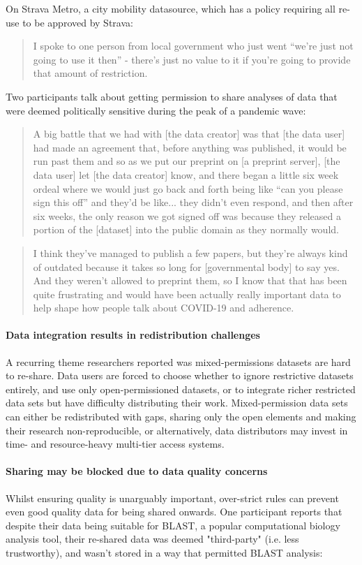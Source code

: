 \documentclass{CUP-JNL-DAP}%
\begin{document}
On Strava Metro, a city mobility datasource, which has a policy requiring all re-use to be approved by Strava:

\blockquote {I spoke to one person from local government who just went \enquote{we're just not going to use it then} - there's just no value to it if you're going to provide that amount of restriction.}

Two participants talk about getting permission to share analyses of data that were deemed politically sensitive during the peak of a pandemic wave: 

\blockquote{A big battle that we had with [the data creator] was that [the data user] had made an agreement that, before anything was published, it would be run past them and so as we put our  preprint on [a preprint server], [the data user] let [the data creator] know, and there began a little six week ordeal where we would just go back and forth being like \enquote{can you please sign this off} and they'd be like... they didn't even respond, and then after six weeks, the only reason we got signed off was because they released a portion of the [dataset] into the public domain as they normally would.}

\blockquote{I think they've managed to publish a few papers, but they're always kind of outdated because it takes so long for [governmental body] to say yes. And they weren't allowed to preprint them, so I know that that has been quite frustrating and would have been actually really important data to help shape how people talk about COVID-19 and adherence.}

\paragraph{Data integration results in redistribution challenges}
A recurring theme researchers reported was mixed-permissions datasets are hard to re-share. Data users are forced to choose whether to ignore restrictive datasets entirely, and use only open-permissioned datasets, or to integrate richer restricted data sets but have difficulty distributing their work. Mixed-permission data sets can either be redistributed with gaps, sharing only the open elements and making their research non-reproducible, or alternatively, data distributors may invest in time- and resource-heavy multi-tier access systems. 

\paragraph{Sharing may be blocked due to data quality concerns}
Whilst ensuring quality is unarguably important, over-strict rules can prevent even good quality data for being shared onwards.  One participant reports that despite their data being suitable for BLAST, a popular computational biology analysis tool, their re-shared data was deemed "third-party" (i.e. less trustworthy), and wasn't stored in a way that permitted BLAST analysis: 
\end{document}
